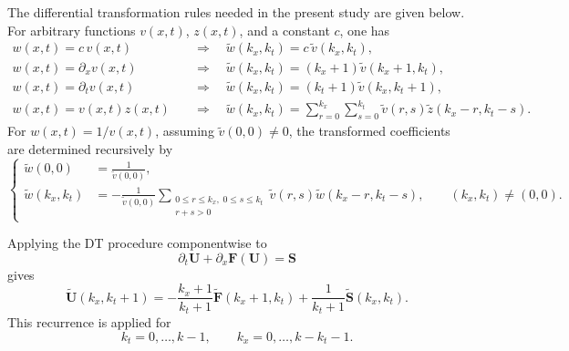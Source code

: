 \documentclass[11pt]{article}
\begin{document}
The differential transformation rules needed in the present study
are given below. For arbitrary functions \(v(x,t)\), \(z(x,t)\), and
a constant \(c\), one has
\begin{align*}
    w(x,t)=c\,v(x,t)
    \quad &\Longrightarrow \quad
    \widetilde{w}(k_x,k_t)
    =
    c\,\widetilde{v}(k_x,k_t),                                      \\[0.3em]
    w(x,t)=\partial_x v(x,t)
    \quad &\Longrightarrow \quad
    \widetilde{w}(k_x,k_t)
    =
    (k_x+1)\widetilde{v}(k_x+1,k_t),                                \\[0.3em]
    w(x,t)=\partial_t v(x,t)
    \quad &\Longrightarrow \quad
    \widetilde{w}(k_x,k_t)
    =
    (k_t+1)\widetilde{v}(k_x,k_t+1),                                \\[0.3em]
    w(x,t)=v(x,t)z(x,t)
    \quad &\Longrightarrow \quad
    \widetilde{w}(k_x,k_t)
    =
    \sum_{r=0}^{k_x}\sum_{s=0}^{k_t}
    \widetilde{v}(r,s)
    \widetilde{z}(k_x-r,k_t-s).
\end{align*}
For \(w(x,t)=1/v(x,t)\), assuming
\(\widetilde{v}(0,0)\neq 0\), the transformed coefficients are
determined recursively by
\[
\left\{
\begin{aligned}
    \widetilde{w}(0,0)
    &=
    \frac{1}{\widetilde{v}(0,0)},                                   \\[0.4em]
    \widetilde{w}(k_x,k_t)
    &=
    -\frac{1}{\widetilde{v}(0,0)}
    \sum_{\substack{0\leq r\leq k_x,\;0\leq s\leq k_t\\r+s>0}}
    \widetilde{v}(r,s)
    \widetilde{w}(k_x-r,k_t-s),
    \qquad (k_x,k_t)\neq(0,0).
\end{aligned}
\right.
\]

Applying the DT procedure componentwise to
\[
    \partial_t\mathbf{U}
    +
    \partial_x\mathbf{F}(\mathbf{U})
    =
    \mathbf{S}
\]
gives
\begin{equation}
    \widetilde{\mathbf{U}}(k_x,k_t+1)
    =
    -\frac{k_x+1}{k_t+1}
    \widetilde{\mathbf{F}}(k_x+1,k_t)
    +
    \frac{1}{k_t+1}
    \widetilde{\mathbf{S}}(k_x,k_t).
    \tag{11}
\end{equation}
This recurrence is applied for
\[
    k_t=0,\ldots,k-1,
    \qquad
    k_x=0,\ldots,k-k_t-1.
\]
\end{document}
